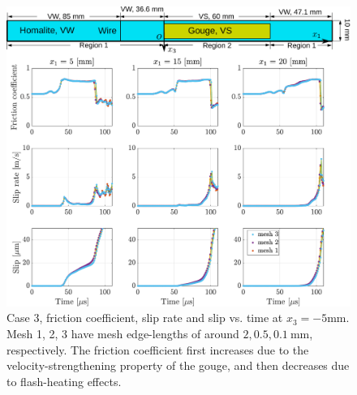 \documentclass[final,a4paper]{elsarticle}
\newif\ifincludetext
\begin{document}
\ifincludetext{
To check that the small-scale oscillations in case 3 with velocity-strengthening plus flash heating gouge, 
as shown in the right-most panel in Figure~\ref{fig:EXPHMVSFH}, 
is physical rather than numerical, 
we run it with three different mesh sizes and check mesh convergence. 
Figure~\ref{fig:meshConv} shows the friction coefficient, 
slip rate and slip vs. time, 
for three different meshes of edge length $2, 0.5, 0.1\ \mathrm{mm}$, 
respectively. 
We first confirm that the oscillations in the results are indeed physical, 
due to the good mesh convergence shown. 
We also see the friction coefficient first increases due to the velocity-strengthening property of the gouge, 
and then decreases due to flash heating dynamic-weakening mechanism. 
}
\fi
\begin{figure}[htbp]
    \centering
    \includegraphics[width=1.\textwidth]{figures/figure_meshconv_0327.pdf}
    \caption{Case 3, friction coefficient, slip rate and slip vs. time at $x_3 = -5 \mathrm{mm}$. 
    Mesh 1, 2, 3 have mesh edge-lengths of around $2, 0.5, 0.1\ \mathrm{mm}$, respectively.
    The friction coefficient first increases due to the velocity-strengthening property of the gouge, 
    and then decreases due to flash-heating effects.}
    \label{fig:meshConv}
\end{figure}
\end{document}
